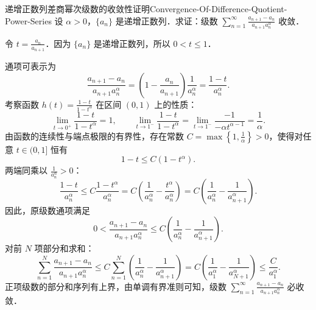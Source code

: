 \begin{problem}{递增正数列差商幂次级数的收敛性证明}{Convergence-Of-Difference-Quotient-Power-Series}
    设 $\alpha > 0$，$\{a_n\}$ 是递增正数列．求证：级数 $\sum_{n=1}^\infty \frac{a_{n+1} - a_n}{a_{n+1} a_n^\alpha}$ 收敛．
\end{problem}

\begin{myproof}
    令 $t = \frac{a_n}{a_{n+1}}$．因为 $\{a_n\}$ 是递增正数列，所以 $0 < t \leqslant 1$．

    通项可表示为
    \begin{equation}
        \frac{a_{n+1} - a_n}{a_{n+1} a_n^\alpha} = \left( 1 - \frac{a_n}{a_{n+1}} \right) \frac{1}{a_n^\alpha} = \frac{1 - t}{a_n^\alpha}.
    \end{equation}
    考察函数 $h(t) = \frac{1 - t}{1 - t^\alpha}$ 在区间 $(0, 1)$ 上的性质：
    \begin{equation}
        \lim_{t \to 0^+} \frac{1 - t}{1 - t^\alpha} = 1, \qquad \lim_{t \to 1^-} \frac{1 - t}{1 - t^\alpha} = \lim_{t \to 1^-} \frac{-1}{-\alpha t^{\alpha-1}} = \frac{1}{\alpha}.
    \end{equation}
    由函数的连续性与端点极限的有界性，存在常数 $C = \max\left\{1, \frac{1}{\alpha}\right\} > 0$，使得对任意 $t \in (0, 1]$ 恒有
    \begin{equation}
        1 - t \leqslant C(1 - t^\alpha).
    \end{equation}
    两端同乘以 $\frac{1}{a_n^\alpha} > 0$：
    \begin{equation}
        \frac{1 - t}{a_n^\alpha} \leqslant C \frac{1 - t^\alpha}{a_n^\alpha} = C \left( \frac{1}{a_n^\alpha} - \frac{t^\alpha}{a_n^\alpha} \right) = C \left( \frac{1}{a_n^\alpha} - \frac{1}{a_{n+1}^\alpha} \right).
    \end{equation}
    因此，原级数通项满足
    \begin{equation}
        0 < \frac{a_{n+1} - a_n}{a_{n+1} a_n^\alpha} \leqslant C \left( \frac{1}{a_n^\alpha} - \frac{1}{a_{n+1}^\alpha} \right).
    \end{equation}
    对前 $N$ 项部分和求和：
    \begin{equation}
        \sum_{n=1}^N \frac{a_{n+1} - a_n}{a_{n+1} a_n^\alpha} \leqslant C \sum_{n=1}^N \left( \frac{1}{a_n^\alpha} - \frac{1}{a_{n+1}^\alpha} \right) = C \left( \frac{1}{a_1^\alpha} - \frac{1}{a_{N+1}^\alpha} \right) \leqslant \frac{C}{a_1^\alpha}.
    \end{equation}
    正项级数的部分和序列有上界，由单调有界准则可知，级数 $\sum_{n=1}^\infty \frac{a_{n+1} - a_n}{a_{n+1} a_n^\alpha}$ 必收敛．
\end{myproof}

